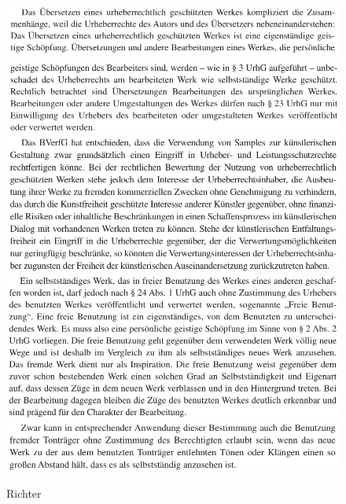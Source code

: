 \documentclass[a4paper, 11pt]{article}
\begin{document}
\begin{figure}
\centering
\includegraphics[width=1\textwidth]{../bearbeitungA.png}
\includegraphics[width=1\textwidth]{../bearbeitungB.png}
\includegraphics[width=1\textwidth]{../dialog.png}
\includegraphics[width=1\textwidth]{../freieNutzung.png}
\includegraphics[width=1\textwidth]{../grosserAbstand.png}
    \caption{Richter}
\label{img:Richter}
\end{figure}
\end{document}
